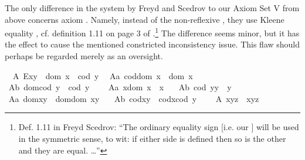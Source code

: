 \begin{isabellebody}
\begin{isamarkuptext}
  The only difference in the system by Freyd and Scedrov to our Axiom Set V from above concerns
  axiom . Namely, instead of the non-reflexive \isa{{\isasymsimeq}}, they use Kleene 
  equality \isa{{\isasymcong}}, cf. definition 1.11 on page 3 of \cite{FreydScedrov90}.\footnote{Def. 1.11 in Freyd 
  Scedrov: ``The ordinary equality sign \isa{{\isacharequal}} [i.e. our \isa{{\isasymcong}}] will be used in the
  symmetric sense, to wit: if either side is defined then so is the other and they are equal. \ldots''} 
  The difference seems minor, but it has the effect to cause the mentioned
  constricted inconsistency issue. This flaw should perhaps be regarded merely as an oversight.%
\end{isamarkuptext}\isamarkuptrue%
%
\isamarkuptrue%
\ \ A{}{\isacharcolon}\ {\isachardoublequoteopen}E{\isacharparenleft}x{\isasymcdot}y{\isacharparenright}\ \isactrlbold {\isasymleftrightarrow}\ dom\ x\ {\isasymsimeq}\ cod\ y{\isachardoublequoteclose}\ \isanewline
\ A{}a{\isacharcolon}\ {\isachardoublequoteopen}cod{\isacharparenleft}dom\ x{\isacharparenright}\ {\isasymcong}\ dom\ x{\isachardoublequoteclose}\ \ \ \isanewline
\ A{}b{\isacharcolon}\ {\isachardoublequoteopen}dom{\isacharparenleft}cod\ y{\isacharparenright}\ {\isasymcong}\ cod\ y{\isachardoublequoteclose}\ \ \ \isanewline
\ A{}a{\isacharcolon}\ {\isachardoublequoteopen}x{\isasymcdot}{\isacharparenleft}dom\ x{\isacharparenright}\ {\isasymcong}\ x{\isachardoublequoteclose}\ \ \isanewline
\ A{}b{\isacharcolon}\ {\isachardoublequoteopen}{\isacharparenleft}cod\ y{\isacharparenright}{\isasymcdot}y\ {\isasymcong}\ y{\isachardoublequoteclose}\ \ \isanewline
\ A{}a{\isacharcolon}\ {\isachardoublequoteopen}dom{\isacharparenleft}x{\isasymcdot}y{\isacharparenright}\ {\isasymcong}\ dom{\isacharparenleft}{\isacharparenleft}dom\ x{\isacharparenright}{\isasymcdot}y{\isacharparenright}{\isachardoublequoteclose}\ \ \isanewline
\ A{}b{\isacharcolon}\ {\isachardoublequoteopen}cod{\isacharparenleft}x{\isasymcdot}y{\isacharparenright}\ {\isasymcong}\ cod{\isacharparenleft}x{\isasymcdot}{\isacharparenleft}cod\ y{\isacharparenright}{\isacharparenright}{\isachardoublequoteclose}\ \ \isanewline
\ \ A{}{\isacharcolon}\ {\isachardoublequoteopen}x{\isasymcdot}{\isacharparenleft}y{\isasymcdot}z{\isacharparenright}\ {\isasymcong}\ {\isacharparenleft}x{\isasymcdot}y{\isacharparenright}{\isasymcdot}z{\isachardoublequoteclose}%

\end{isabellebody}
